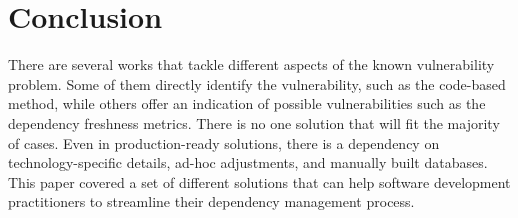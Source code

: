 \documentclass[pdf,bookmarks,colorlinks=true]{IEEEtran}
\begin{document}
\section{Conclusion}
\label{sec:Conclusion}

There are several works that tackle different aspects of the known vulnerability problem. Some of them directly identify the vulnerability, such as the code-based method, while others offer an indication of possible vulnerabilities such as the dependency freshness metrics. There is no one solution that will fit the majority of cases. Even in production-ready solutions, there is a dependency on technology-specific details, ad-hoc adjustments, and manually built databases. This paper covered a set of different solutions that can help software development practitioners to streamline their dependency management process.  



\end{document}

